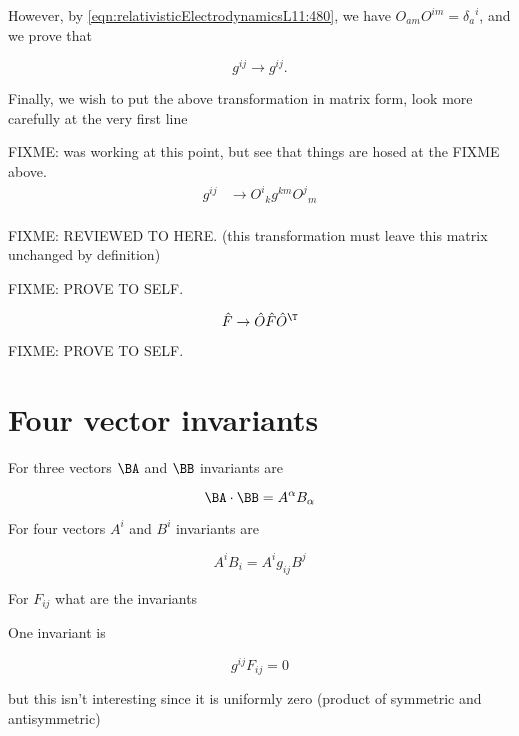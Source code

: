 However, by \ref{eqn:relativisticElectrodynamicsL11:480}, we have $O_{a m} O^{i m} = {\delta_a}^i$, and we prove that 

\begin{equation}\label{eqn:relativisticElectrodynamicsL11:n}
g^{ij} \rightarrow g^{ij}.
\end{equation}

Finally, we wish to put the above transformation in matrix form, look more carefully at the very first line

FIXME: was working at this point, but see that things are hosed at the FIXME above.
\begin{align*}
g^{ij}
&\rightarrow {O^i}_k g^{km} {O^j}_m \\
\end{align*}

FIXME: REVIEWED TO HERE.
(this transformation must leave this matrix unchanged by definition) 

FIXME: PROVE TO SELF.

\begin{equation}\label{eqn:relativisticElectrodynamicsL11:490}
\hat{F} \rightarrow \hat{O} \hat{F} \hat{O}^\T 
\end{equation}

FIXME: PROVE TO SELF.

\section{Four vector invariants}

For three vectors $\BA$ and $\BB$ invariants are

\begin{equation}\label{eqn:relativisticElectrodynamicsL11:510}
\BA \cdot \BB = A^\alpha B_\alpha
\end{equation}

For four vectors $A^i$ and $B^i$ invariants are

\begin{equation}\label{eqn:relativisticElectrodynamicsL11:530}
A^i B_i = A^i g_{ij} B^j  
\end{equation}

For $F_{ij}$ what are the invariants

One invariant is

\begin{equation}\label{eqn:relativisticElectrodynamicsL11:550}
g^{ij} F_{ij} = 0
\end{equation}

but this isn't interesting since it is uniformly zero (product of symmetric and antisymmetric)


